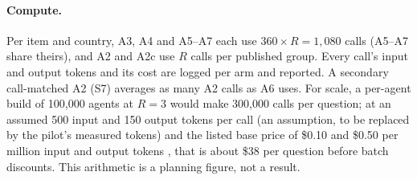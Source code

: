 \documentclass[11pt]{article}
\begin{document}
\paragraph{Compute.} Per item and country, A3, A4 and A5--A7 each use $360\times R=1{,}080$ calls (A5--A7 share theirs), and A2 and A2c use $R$ calls per published group. Every call's input and output tokens and its cost are logged per arm and reported. A secondary call-matched A2 (S7) averages as many A2 calls as A6 uses. For scale, a per-agent build of 100{,}000 agents at $R=3$ would make 300{,}000 calls per question; at an assumed 500 input and 150 output tokens per call (an assumption, to be replaced by the pilot's measured tokens) and the listed base price of \$0.10 and \$0.50 per million input and output tokens \citep{anthropic2026models}, that is about \$38 per question before batch discounts. This arithmetic is a planning figure, not a result.
\end{document}
